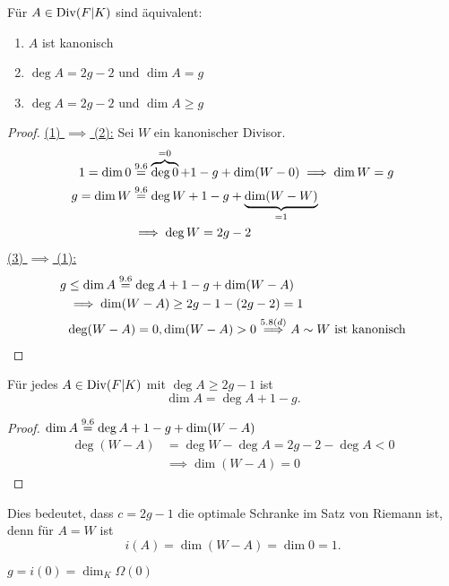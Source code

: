 \begin{korollar}
    Für $A \in \operatorname{Div}(F|K)$ sind äquivalent:
    \begin{enumerate}[label=(\arabic*)]
        \item $A$ ist kanonisch
        \item $\deg A = 2 g - 2$ und $\dim A = g$
        \item $\deg A = 2 g - 2$ und $\dim A \geq g$
    \end{enumerate}
\end{korollar}
\begin{proof}
    \underline{(1) $ \implies$ (2):} Sei $W$ ein kanonischer Divisor.
    \begin{align*}
        1 = \dim 0 &\stackrel{9.6}{=} \overbrace{\deg 0}^{=0} + 1 - g+ \dim(W-0) \implies \dim W = g\\
        g = \dim W &\stackrel{9.6}{=} \deg W + 1 - g + \underbrace{\dim (W-W)}_{=1}\\
        & \implies \deg W = 2 g - 2
    \end{align*}
    \underline{(3) $ \implies$ (1):}
    \begin{align*}
        g &\leq \dim A \stackrel{9.6}{=} \deg A + 1 - g + \dim(W-A)\\
        & \implies \dim (W-A) \geq 2g -1 - (2g - 2) = 1\\
        & \deg(W-A) = 0, \dim(W-A)>0 \stackrel{5.8(d)}{\implies}A\sim W \text{ ist kanonisch}
    \end{align*}
\end{proof}

\begin{korollar}
    Für jedes $A \in \operatorname{Div}(F|K)$ mit $\deg A \geq 2g -1$ ist
    $$ \dim A = \deg A + 1 -g.$$
\end{korollar}
\begin{proof}
    $ \dim A \stackrel{9.6}{=} \deg A + 1 - g + \dim (W-A)$
    \begin{align*}
        \deg (W-A) &= \deg W - \deg A = 2g -2 - \deg A < 0\\
        & \implies \dim(W-A) = 0
    \end{align*}
\end{proof}

\begin{bemerkungnr}
    Dies bedeutet, dass $c = 2g -1$ die optimale Schranke im Satz von Riemann ist, denn für $A=W$ ist 
    $$ i(A) = \dim (W-A) = \dim 0 = 1.$$
\end{bemerkungnr}

\begin{bemerkungnr}
    $g = i(0) = \dim_K \Omega(0)$
\end{bemerkungnr}